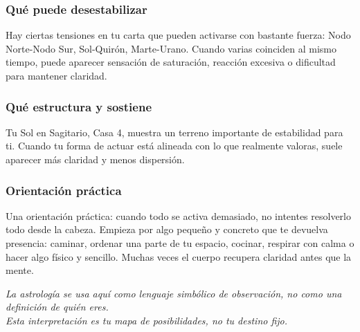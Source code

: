 \documentclass[11pt,a4paper]{article}
\begin{document}
\subsubsection*{Qué puede desestabilizar}
Hay ciertas tensiones en tu carta que pueden activarse con bastante fuerza: Nodo Norte-Nodo Sur, Sol-Quirón, Marte-Urano. Cuando varias coinciden al mismo tiempo, puede aparecer sensación de saturación, reacción excesiva o dificultad para mantener claridad.

\subsubsection*{Qué estructura y sostiene}
Tu Sol en Sagitario, Casa 4, muestra un terreno importante de estabilidad para ti. Cuando tu forma de actuar está alineada con lo que realmente valoras, suele aparecer más claridad y menos dispersión.

\subsubsection*{Orientación práctica}
Una orientación práctica: cuando todo se activa demasiado, no intentes resolverlo todo desde la cabeza. Empieza por algo pequeño y concreto que te devuelva presencia: caminar, ordenar una parte de tu espacio, cocinar, respirar con calma o hacer algo físico y sencillo. Muchas veces el cuerpo recupera claridad antes que la mente.

\vspace{1cm}
\begin{center}
{\small\itshape\color{grisai}
La astrología se usa aquí como lenguaje simbólico de observación, no como una definición de quién eres.\\
Esta interpretación es tu mapa de posibilidades, no tu destino fijo.
}
\end{center}
\end{document}

